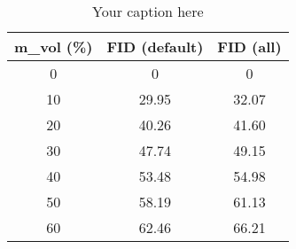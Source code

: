 \begin{table}
    \centering
    \begin{tabular}{|c|c|c|}
        \hline
        m\_vol (\%) & FID (default) & FID (all) \\
        \hline
        0 & 0 & 0 \\
        10 & 29.95 & 32.07 \\
        20 & 40.26 & 41.60 \\
        30 & 47.74 & 49.15 \\
        40 & 53.48 & 54.98 \\
        50 & 58.19 & 61.13 \\
        60 & 62.46 & 66.21 \\
        \hline
    \end{tabular}
    \caption{Your caption here}
    \label{tab:yourlabel}
\end{table}